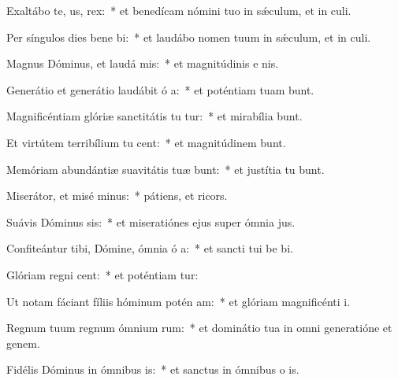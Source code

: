 \item Exaltábo te,  us, rex:~* et benedícam nómini tuo in sǽculum, et in  culi.
\item Per síngulos dies bene bi:~* et laudábo nomen tuum in sǽculum, et in  culi.
\item Magnus Dóminus, et laudá mis:~* et magnitúdinis e   nis.
\item Generátio et generátio laudábit ó a:~* et poténtiam tuam bunt.
\item Magnificéntiam glóriæ sanctitátis tu tur:~* et mirabília  bunt.
\item Et virtútem terribílium tu cent:~* et magnitúdinem  bunt.
\item Memóriam abundántiæ suavitátis tuæ bunt:~* et justítia tu bunt.
\item Miserátor, et misé minus:~* pátiens, et  ricors.
\item Suávis Dóminus sis:~* et miseratiónes ejus super ómnia  jus.
\item Confiteántur tibi, Dómine, ómnia ó a:~* et sancti tui be bi.
\item Glóriam regni  cent:~* et poténtiam  tur:
\item Ut notam fáciant fíliis hóminum potén am:~* et glóriam magnificénti  i.
\item Regnum tuum regnum ómnium rum:~* et dominátio tua in omni generatióne et genem.
\item Fidélis Dóminus in ómnibus  is:~* et sanctus in ómnibus o is.
